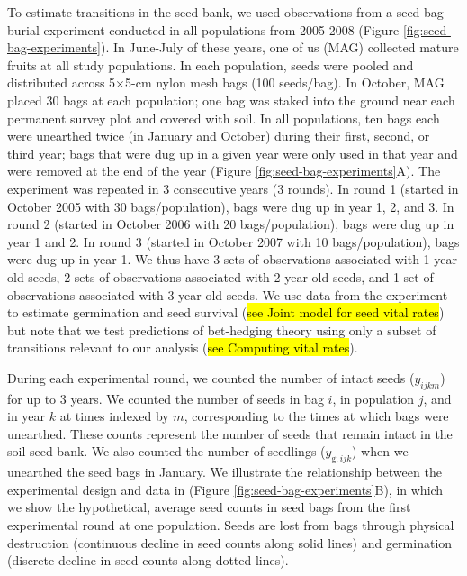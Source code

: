 \documentclass[12pt, oneside, titlepage]{article}   	%
\begin{document}
{To estimate transitions in the seed bank, we used observations from a seed bag burial experiment conducted in all populations from 2005-2008 (Figure \ref{fig:seed-bag-experiments}). In June-July of these years, one of us (MAG) collected mature fruits at all study populations. In each population, seeds were pooled and distributed across 5$\times$5-cm nylon mesh bags (100 seeds/bag). In October, MAG placed 30 bags at each population; one bag was staked into the ground near each permanent survey plot and covered with soil. In all populations, ten bags each were unearthed twice (in January and October) during their first, second, or third year; bags that were dug up in a given year were only used in that year and were removed at the end of the year (Figure \ref{fig:seed-bag-experiments}A). The experiment was repeated in 3 consecutive years (3 rounds). In round 1 (started in October 2005 with 30 bags/population), bags were dug up in year 1, 2, and 3. In round 2 (started in October 2006 with 20 bags/population), bags were dug up in year 1 and 2. In round 3 (started in October 2007 with 10 bags/population), bags were dug up in year 1. We thus have 3 sets of observations associated with 1 year old seeds, 2 sets of observations associated with 2 year old seeds, and 1 set of observations associated with 3 year old seeds. We use data from the experiment to estimate germination and seed survival (\hl{see Joint model for seed vital rates}) but note that we test predictions of bet-hedging theory using only a subset of transitions relevant to our analysis (\hl{see Computing vital rates}).

During each experimental round, we counted the number of intact seeds ($y_{ijkm}$) for up to 3 years. We counted the number of seeds in bag $i$, in population $j$, and in year $k$ at times indexed by $m$, corresponding to the times at which bags were unearthed. These counts represent the number of seeds that remain intact in the soil seed bank. We also counted the number of seedlings ($y_{\mathrm{g},ijk}$) when we unearthed the seed bags in January. We illustrate the relationship between the experimental design and data in (Figure \ref{fig:seed-bag-experiments}B), in which we show the hypothetical, average seed counts in seed bags from the first experimental round at one population. Seeds are lost from bags through physical destruction (continuous decline in seed counts along solid lines) and germination (discrete decline in seed counts along dotted lines). 

}
\end{document}
